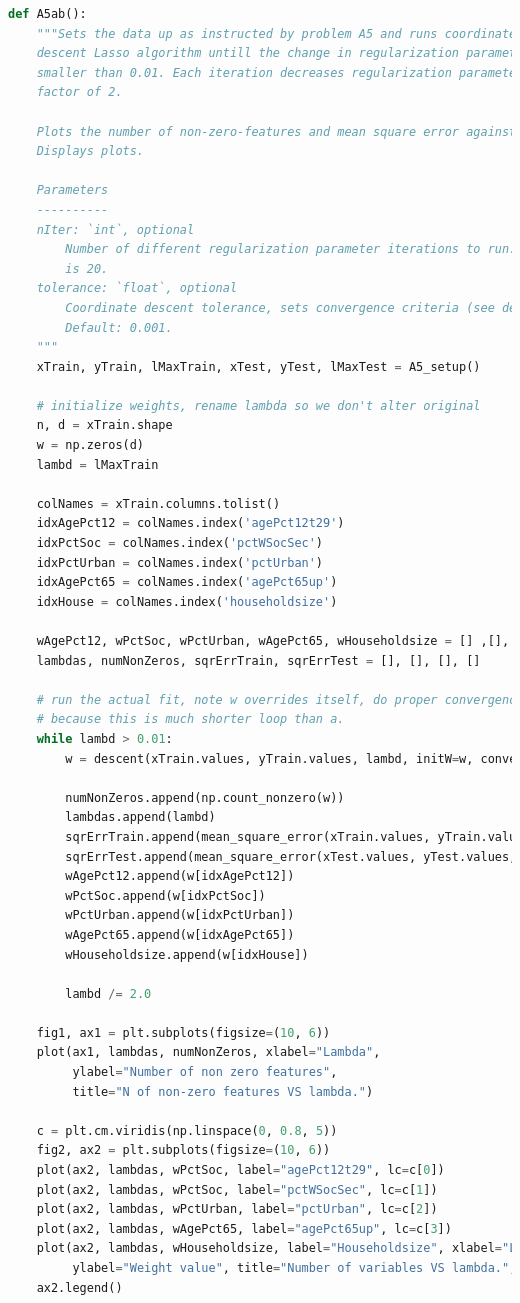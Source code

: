 \documentclass{article}
\newcommand{\1}{\mathbf{1}}
\begin{document}
\begin{enumerate}
\begin{lstlisting}[language=Python]
def A5ab():
    """Sets the data up as instructed by problem A5 and runs coordinate
    descent Lasso algorithm untill the change in regularization parameter is
    smaller than 0.01. Each iteration decreases regularization parameter by a
    factor of 2.

    Plots the number of non-zero-features and mean square error against lambda.
    Displays plots.

    Parameters
    ----------
    nIter: `int`, optional
        Number of different regularization parameter iterations to run. Default
        is 20.
    tolerance: `float`, optional
        Coordinate descent tolerance, sets convergence criteria (see descent).
        Default: 0.001.
    """
    xTrain, yTrain, lMaxTrain, xTest, yTest, lMaxTest = A5_setup()

    # initialize weights, rename lambda so we don't alter original
    n, d = xTrain.shape
    w = np.zeros(d)
    lambd = lMaxTrain

    colNames = xTrain.columns.tolist()
    idxAgePct12 = colNames.index('agePct12t29')
    idxPctSoc = colNames.index('pctWSocSec')
    idxPctUrban = colNames.index('pctUrban')
    idxAgePct65 = colNames.index('agePct65up')
    idxHouse = colNames.index('householdsize')

    wAgePct12, wPctSoc, wPctUrban, wAgePct65, wHouseholdsize = [] ,[], [], [], []
    lambdas, numNonZeros, sqrErrTrain, sqrErrTest = [], [], [], []

    # run the actual fit, note w overrides itself, do proper convergence
    # because this is much shorter loop than a.
    while lambd > 0.01:
        w = descent(xTrain.values, yTrain.values, lambd, initW=w, convergeFast=False)

        numNonZeros.append(np.count_nonzero(w))
        lambdas.append(lambd)
        sqrErrTrain.append(mean_square_error(xTrain.values, yTrain.values, w))
        sqrErrTest.append(mean_square_error(xTest.values, yTest.values, w))
        wAgePct12.append(w[idxAgePct12])    
        wPctSoc.append(w[idxPctSoc])
        wPctUrban.append(w[idxPctUrban])
        wAgePct65.append(w[idxAgePct65])
        wHouseholdsize.append(w[idxHouse])

        lambd /= 2.0

    fig1, ax1 = plt.subplots(figsize=(10, 6))
    plot(ax1, lambdas, numNonZeros, xlabel="Lambda",
         ylabel="Number of non zero features",
         title="N of non-zero features VS lambda.")

    c = plt.cm.viridis(np.linspace(0, 0.8, 5))
    fig2, ax2 = plt.subplots(figsize=(10, 6))
    plot(ax2, lambdas, wPctSoc, label="agePct12t29", lc=c[0])
    plot(ax2, lambdas, wPctSoc, label="pctWSocSec", lc=c[1])
    plot(ax2, lambdas, wPctUrban, label="pctUrban", lc=c[2])
    plot(ax2, lambdas, wAgePct65, label="agePct65up", lc=c[3])
    plot(ax2, lambdas, wHouseholdsize, label="Householdsize", xlabel="Lambda",
         ylabel="Weight value", title="Number of variables VS lambda.", lc=c[4])
    ax2.legend()
    

\end{lstlisting}
\end{enumerate}
\end{document}

